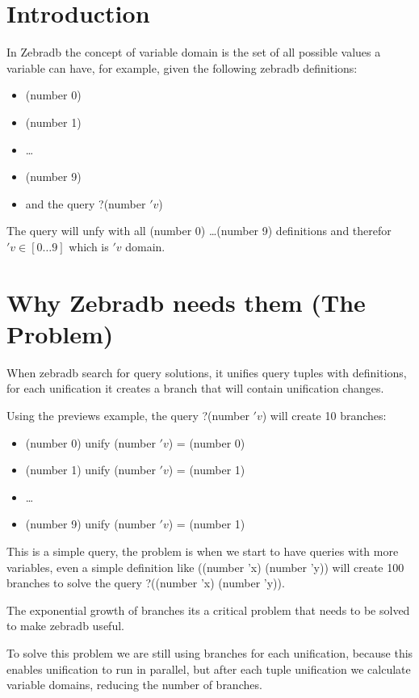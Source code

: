 \documentclass{article}
\begin{document}
\section{Introduction}

In Zebradb the concept of variable domain is the set of all possible values a variable can have,
for example, given the following zebradb definitions:

\begin{itemize}
      \item (number 0)
      \item (number 1)
      \item \ldots
      \item (number 9)
      \item and the query ?(number $'v$)
\end{itemize}

The query will unfy with all (number 0) \ldots (number 9) definitions and therefor $'v \in [0 \ldots 9]$ which is $'v$ domain.

\section{Why Zebradb needs them (The Problem)}

When zebradb search for query solutions, it unifies query tuples with definitions, for each unification it creates a branch that 
will contain unification changes.

Using the previews example, the query ?(number $'v$) will create 10 branches:

\begin{itemize}
      \item (number 0) unify (number $'v$) = (number 0)  
      \item (number 1) unify (number $'v$) = (number 1)
      \item \ldots
      \item (number 9) unify (number $'v$) = (number 1)
\end{itemize}

This is a simple query, the problem is when we start to have queries with more variables, even a simple definition like 
((number 'x) (number 'y)) will create 100 branches to solve the query ?((number 'x) (number 'y)).

The exponential growth of branches its a critical problem that needs to be solved to make zebradb useful.

To solve this problem we are still using branches for each unification, because this enables unification to run in 
parallel, but after each tuple unification we calculate variable domains, reducing the number of branches. 
\end{document}
